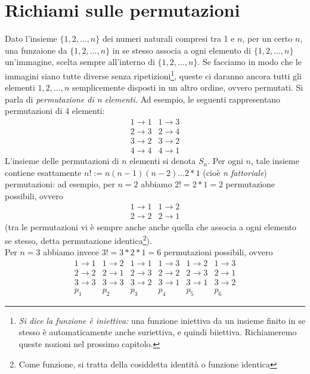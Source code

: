 \documentclass{book}
\begin{document}
\section {Richiami sulle permutazioni \label{ricsullperm}}
Dato l'insieme $\{1,2,\dots,n\}$ dei numeri naturali compresi tra 1 e $n$, per un certo $n$, una funzaione
da $\{1,2,\dots,n\}$ in se stesso associa a ogni elemento di $\{1,2,\dots,n\}$ un'immagine, scelta sempre
all'interno di $\{1,2,\dots,n\}$. Se facciamo in modo che le immagini siano tutte diverse senza
ripetizioni\footnote{\textit{Si dice la funzione è iniettiva:} una funzione iniettiva da un insieme finito in
  se stesso è automaticamente anche suriettiva, e quindi biiettiva. Richiameremo queste nozioni nel prossimo capitolo.},
queste ci daranno ancora tutti gli elementi $1,2,\dots,n$ semplicemente disposti in un altro ordine, ovvero permutati.
Si parla di {\em permutazione di n elementi.} Ad esempio, le seguenti rappresentano permutazioni di 4 elementi:
\begin{equation*}
  \begin{matrix}
    1 \to 1 & 1 \to 3\\
    2 \to 3 & 2 \to 4\\
    3 \to 2 & 3 \to 2\\
    4 \to 4 & 4 \to 1
  \end{matrix}
\end{equation*}
L'insieme delle permutazioni di $n$ elementi si denota $S_n$. Per ogni $n$, tale insieme contiene esattamente $n!:=n(n-1)(n-2)\dots 2*1$ (cioè {\it n fattoriale}) permutazioni: ad esempio, per $n = 2$ abbiamo $2!= 2 * 1 = 2$ permutazione possibili, ovvero
\begin{equation*}
  \begin{matrix}
    1 \to 1 & 1 \to 2\\
    2 \to 2 & 2 \to 1
  \end{matrix}
\end{equation*}
(tra le permutazioni vi è sempre anche anche quella che associa a ogni elemento se stesso, detta permutazione identica\footnote{Come funzione, si tratta della cosiddetta identità o funzione identica}).\\
Per $n=3$ abbiamo invece $3!=3*2*1=6$ permutazioni possibili, ovvero
\begin{equation*}
  \begin{matrix}
    1 \to 1 & 1 \to 2 & 1 \to 1 & 1 \to 3 & 1 \to 2 & 1 \to 3 \\
    2 \to 2 & 2 \to 1 & 2 \to 3 & 2 \to 2 & 2 \to 3 & 2 \to 1 \\
    3 \to 3 & 3 \to 3 & 3 \to 2 & 3 \to 1 & 3 \to 1 & 3 \to 2 \\
      p_1   &    p_2   &   p_3   &    p_4  &    p_5  &    p_6
  \end{matrix}
\end{equation*}
\end{document}
